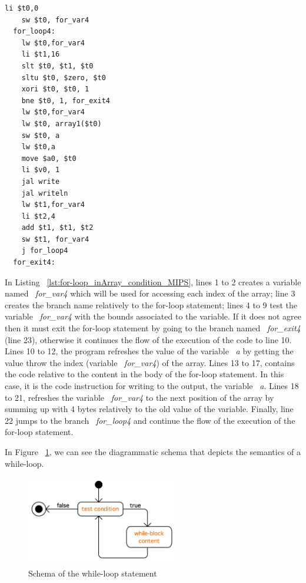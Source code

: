 \documentclass[
  oneside,
  11pt, a4paper,
  footinclude=true,
  headinclude=true,
  cleardoublepage=empty
]{scrbook}
\begin{document}
\begin{lstlisting}[caption={Iterative code generated for the LISS program in Listing ~\ref{lst:for-loop_inArray_condition_LISS}},label={lst:for-loop_inArray_condition_MIPS}]
    li $t0,0		
    sw $t0, for_var4		
  for_loop4:
    lw $t0,for_var4		
    li $t1,16		
    slt $t0, $t1, $t0	
    sltu $t0, $zero, $t0	
    xori $t0, $t0, 1	
    bne $t0, 1, for_exit4		
    lw $t0,for_var4		
    lw $t0, array1($t0)		
    sw $t0, a		
    lw $t0,a		
    move $a0, $t0		
    li $v0, 1
    jal write		
    jal writeln		
    lw $t1,for_var4		
    li $t2,4		
    add $t1, $t1, $t2	
    sw $t1, for_var4		
    j for_loop4		
  for_exit4:
\end{lstlisting}

In Listing ~\ref{lst:for-loop_inArray_condition_MIPS}, lines 1 to 2 creates a variable named ~\textit{for\_var4} which will be used for accessing each index of the array; line 3 creates the branch name relatively to the for-loop statement; lines 4 to 9 test the variable ~\textit{for\_var4} with the bounds associated to the variable. If it does not agree then it must exit the for-loop statement by going to the branch named ~\textit{for\_exit4} (line 23), otherwise it continues the flow of the execution of the code to line 10. Lines 10 to 12, the program refreshes the value of the variable ~\textit{a} by getting the value throw the index (variable ~\textit{for\_var4}) of the array. Lines 13 to 17, contains the code relative to the content in the body of the for-loop statement. In this case, it is the code instruction for writing to the output, the variable ~\textit{a}. Lines 18 to 21, refreshes the variable ~\textit{for\_var4} to the next position of the array by summing up with 4 bytes relatively to the old value of the variable. Finally, line 22 jumps to the branch ~\textit{for\_loop4} and continue the flow of the execution of the for-loop statement.

In Figure ~\ref{fig:for-loop_inArray}, we can see the diagrammatic schema that depicts the semantics of a while-loop.

\begin{figure}[h!]
  \centering
    \includegraphics[width=0.6\textwidth]{img/while-loop.png}
    \caption{Schema of the while-loop statement}
    \label{fig:for-loop_inArray}
\end{figure}
\end{document}

